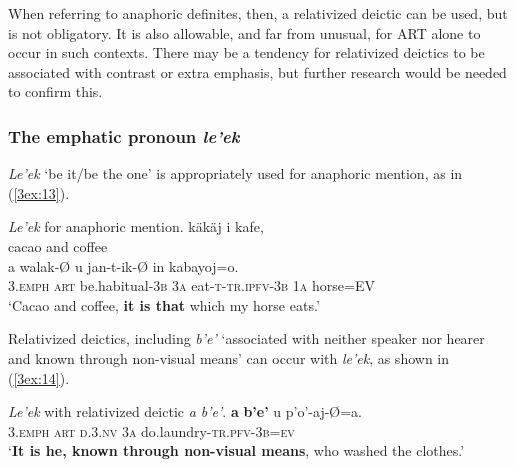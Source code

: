 \documentclass[output=paper]{langsci/langscibook}
\begin{document}
When referring to anaphoric definites, then, a relativized deictic can be used, but is not obligatory. It is also allowable, and far from unusual, for ART alone to occur in such contexts.  There may be a tendency for relativized deictics to be associated with contrast or extra emphasis, but further research would be needed to confirm this.


\subsubsection{The emphatic pronoun {\emph{le'ek}} }\label{3sec:313}
{\emph{Le'ek}} `be it/be the one' is appropriately used for anaphoric mention, as in (\ref{3ex:13}).

\newpage
\begin{exe}
\ex\label{3ex:13}
{\emph{Le'ek}} for anaphoric mention. 
\exi{}
\gll 	k\"ak\"aj 	i	kafe, 	 \\
	cacao	and	coffee	 \\
\glt
\exi{}
	 	a 	walak-{\O}	 		u 		jan-t-ik-{\O}			in 		kabayoj=o. \\
	3.{\textsc{emph}}	{\textsc{art}}	be.habitual-{\textsc{3b}} 	3{\textsc{a}}	eat-{\textsc{t-tr.ipfv-3b}}	1{\textsc{a}}	horse{\textsc{=EV}} \\
\glt 	`Cacao and coffee, {\textbf{it is that}} which my horse eats.'
\end{exe}

{
Relativized deictics, including {\emph{b'e'}} `associated with neither speaker nor hearer and known through non-visual means' can occur with {\emph{le'ek}}, as shown in (\ref{3ex:14}).
}

\begin{exe}
\ex\label{3ex:14}
{\emph{Le'ek}} with relativized deictic {\emph{a b'e'}}. 
\exi{}
 	{\textbf{a}} 	{\textbf{b'e'}}		u 		p'o'-aj-\O=a. \\
	3.{\textsc{emph}}	{\textsc{art}}	{\textsc{d.3.nv}}	3{\textsc{a}}	do.laundry-{\textsc{tr.pfv-3b=ev}} \\
\glt	`{\textbf{It is he, known through non-visual means}}, who washed the clothes.'
\end{exe}
\end{document}
